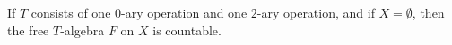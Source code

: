 If $T$ consists of one $0$-ary operation and one $2$-ary operation, and if $X = \emptyset$, then the free $T$-algebra $F$ on $X$ is countable.
